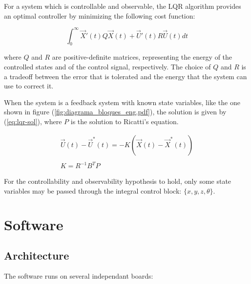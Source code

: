\documentclass[conference]{IEEEtran}
\newcommand{\refp}[1]{(\ref{#1})}
\begin{document}
For a system which is controllable and observable\cite{bib:hakas}, the LQR algorithm provides an optimal controller\cite{bib:lqrnotes} by minimizing the following cost function:

\begin{equation}
\label{eq:lqr}
\int_{0}^{\infty}  \vec{X}'(t)Q \vec{X}(t)+\vec{U}'(t)R\vec{U}(t)dt
\end{equation}

where $Q$ and $R$ are positive-definite matrices, representing the energy of the controlled states and of the control signal, respectively. The choice of $Q$ and $R$ is a tradeoff between the error that is tolerated and the energy that the system can use to correct it.

 When the system is a feedback system with known state variables, like the one shown in figure \refp{fig:diagrama_bloques_eng.pdf}, the solution is given by \refp{eq:lqr-sol}, where $P$ is the solution to Ricatti's equation.

\begin{equation}
\begin{array}{c}
\vec{U}(t)-\vec{U}^*(t) = -K(\vec{X}(t)-\vec{X}^*(t))\\
\\
K = R^{-1}B^TP
\end{array}
\label{eq:lqr-sol}
\end{equation}

For the controllability and observability hypothesis to hold, only some state variables may be passed through the integral control block: $\{x,y,z,\theta\}$.

\section{Software}

\subsection{Architecture}
\label{sec:software-arch}

The software runs on several independant boards:
\end{document}
